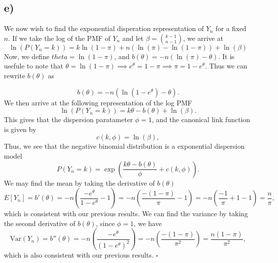 \documentclass{article}
\theoremstyle{definition}
\theoremstyle{remark}
\begin{document}
\subsection*{e)}
We now wish to find the exponential disperation representation of $Y_n$ for a fixed $n$. If we take the log of the PMF of $Y_n$ and let $\beta = \binom{k-1}{n-1}$, we arrive at
\begin{equation}
    \ln(P(Y_n = k))  = k\ln(1 - \pi) + n\left(\ln(\pi) - \ln(1 - \pi)\right) + \ln(\beta)
\end{equation}
Now, we define $theta = \ln(1 - \pi)$, and $b(\theta) = -n\left(\ln(\pi) - \theta\right)$. It is usefule to note that $\theta = \ln(1 - \pi) \implies e^{\theta} = 1 - \pi \implies \pi = 1 - e^{\theta}$. Thus we can rewrite $b(\theta)$ as

\begin{equation}
    b(\theta) = -n\left(\ln(1 - e^{\theta}) - \theta\right).
\end{equation}
We then arrive at the following representation of the log PMF
\begin{equation}
    \ln(P(Y_n = k)) = k\theta - b(\theta) + \ln(\beta).
\end{equation}
This gives that the dispersion paratameter $\phi = 1$, and the canonical link function is given by
\begin{equation}
    c(k, \phi) = \ln(\beta),
\end{equation}
Thus, we see that the negative binomial distribution is a exponential dispersion model
\begin{equation}
    P(Y_n = k) = \exp\left(\dfrac{k\theta - b(\theta)}{\phi} + c(k, \phi)\right).
\end{equation}
We may find the mean by taking the derivative of $b(\theta)$
\begin{equation}
    E[Y_n] = b'(\theta) = -n\left(\dfrac{-e^{\theta}}{1 - e^{\theta}} - 1\right) = -n\left(\dfrac{-(1 - \pi)}{\pi} - 1\right) = -n\left(\dfrac{-1}{\pi} + 1 - 1 \right) = \dfrac{n}{\pi},
\end{equation}
which is consistent with our previous results. We can find the variance by taking the second derivative of $b(\theta)$, since $\phi = 1$, we have
\begin{equation}
    \text{Var}(Y_n) = b''(\theta) = -n\left(\dfrac{-e^{\theta}}{(1 - e^{\theta})^2} \right) = -n\left(\dfrac{-(1 - \pi)}{\pi^2} \right) = \dfrac{n(1 - \pi)}{\pi^2},
\end{equation}
which is also consistent with our previous results. $\square$
\end{document}

